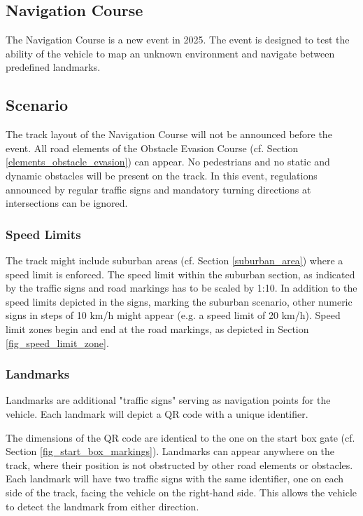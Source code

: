 
\begin{highlight}[yellow]

    \section{Navigation Course}
    \label{navigation_course}

    The Navigation Course is a new event in 2025. The event is designed to test the
    ability of the vehicle to map an unknown environment and navigate between
    predefined landmarks.

    \subsection{Scenario}

    The track layout of the Navigation Course will not be announced before the
    event. All road elements of the Obstacle Evasion Course (cf. Section
    \ref{elements_obstacle_evasion}) can appear. No pedestrians and no static and
    dynamic obstacles will be present on the track. In this event, regulations
    announced by regular traffic signs and mandatory turning directions at
    intersections can be ignored.

    \subsubsection{Speed Limits}

    The track might include suburban areas (cf. Section \ref{suburban_area}) where
    a speed limit is enforced. The speed limit within the suburban section, as
    indicated by the traffic signs and road markings has to be scaled by 1:10. In
    addition to the speed limits depicted in the signs, marking the suburban
    scenario, other numeric signs in steps of 10 km/h might appear (e.g. a speed
    limit of 20 km/h). Speed limit zones begin and end at the road markings, as
    depicted in Section \ref{fig_speed_limit_zone}.

    \subsubsection{Landmarks}
    \label{landmarks}

    Landmarks are additional "traffic signs" serving as navigation points for the
    vehicle. Each landmark will depict a QR code with a unique identifier.

    The dimensions of the QR code are identical to the one on the start box gate
    (cf. Section \ref{fig_start_box_markings}). Landmarks can appear anywhere on
    the track, where their position is not obstructed by other road elements or
    obstacles. Each landmark will have two traffic signs with the same identifier,
    one on each side of the track, facing the vehicle on the right-hand side. This
    allows the vehicle to detect the landmark from either direction.


\end{highlight}

